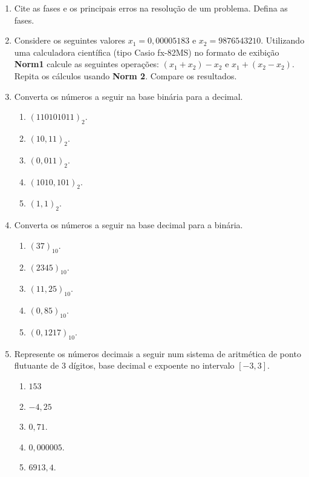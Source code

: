 \documentclass[
	12pt,				%
	openright,			%
	twoside,			%
	a4paper,			%
	english,			%
	french,				%
	brazil,				%
	sumario=tradicional
]{abntex2}
\numberwithin{example}{chapter}
\numberwithin{remark}{chapter}
\numberwithin{definition}{chapter}
\numberwithin{figure}{chapter}
\begin{document}
\begin{enumerate}
    \item Cite as fases e os principais erros na resolução de um problema. Defina as fases.
    
    \item Considere os seguintes valores $x_1=0,00005183$ e $x_2=9876543210$. Utilizando uma calculadora científica (tipo Casio fx-82MS) no formato de exibição \textbf{Norm1} calcule as seguintes operações: $(x_1+x_2)-x_2$ e $x_1+(x_2-x_2)$. Repita os cálculos usando \textbf{Norm 2}. Compare os resultados.

    \item Converta os números a seguir na base binária para a decimal.
        \begin{enumerate}
            \item $(110101011)_2$.
            \item $(10,11)_2$.
            \item $(0,011)_2$.
            \item $(1010,101)_2$.
            \item $(1,1)_2$.
        \end{enumerate}

    \item Converta os números a seguir na base decimal para a binária.
        \begin{enumerate}
            \item $(37)_{10}$.
            \item $(2345)_{10}$.
            \item $(11,25)_{10}$.
            \item $(0,85)_{10}$.
            \item $(0,1217)_{10}$.
        \end{enumerate}

    \item Represente os números decimais a seguir num sistema de aritmética de ponto flutuante de 3 dígitos, base decimal e expoente no intervalo $[-3, 3]$.
        \begin{enumerate}
            \item $153$
            \item $-4,25$
            \item $0,71$.
            \item $0,000005$.
            \item $6913,4$.
        \end{enumerate}


\end{enumerate}
\end{document}
